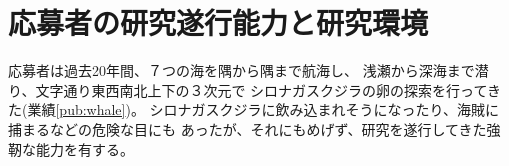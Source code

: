 \documentclass[11pt,a4j,dvipdfmx]{jarticle} 					%
\newcommand{\研究課題名}{象の卵}
\newcommand{\研究機関名}{逢坂大学}
\newcommand{\研究代表者氏名}{湯川秀樹}
\newcommand{\研究期間の最終元号年度}{8}  %
\begin{document}




\section{応募者の研究遂行能力と研究環境}

	応募者は過去20年間、７つの海を隅から隅まで航海し、
	浅瀬から深海まで潜り、文字通り東西南北上下の３次元で
	シロナガスクジラの卵の探索を行ってきた(業績\ref{pub:whale})。		%
	シロナガスクジラに飲み込まれそうになったり、海賊に捕まるなどの危険な目にも
	あったが、それにもめげず、研究を遂行してきた強靭な能力を有する。

\PapersInstructions	%



\end{document}
